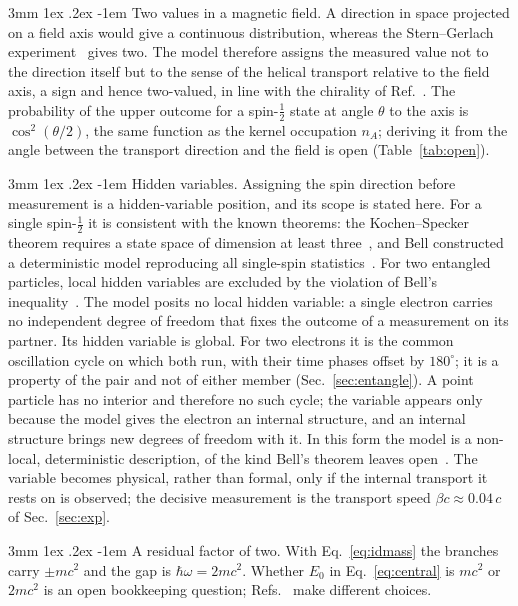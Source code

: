 \documentclass[%
 reprint, amsmath,amssymb, aps, prb, ]{revtex4-2}
\makeatletter
\numberwithin{equation}{section}
\renewcommand\paragraph{%
  \@startsection{paragraph}{4}{\z@}%
    {3mm \@plus 1ex \@minus .2ex}
    {-1em}
    {\normalfont\normalsize\itshape}}
\makeatother
\begin{document}
\paragraph{Two values in a magnetic field.} A direction in space projected on a field axis would give a continuous distribution, whereas the Stern--Gerlach experiment~\cite{ref:gerlach} gives two. The model therefore assigns the measured value not to the direction itself but to the sense of the helical transport relative to the field axis, a sign and hence two-valued, in line with the chirality of Ref.~\cite{ref:p50}. The probability of the upper outcome for a spin-$\tfrac12$ state at angle $\theta$ to the axis is $\cos^2(\theta/2)$, the same function as the kernel occupation $n_A$; deriving it from the angle between the transport direction and the field is open (Table~\ref{tab:open}).

\paragraph{Hidden variables.} Assigning the spin direction before measurement is a hidden-variable position, and its scope is stated here. For a single spin-$\tfrac12$ it is consistent with the known theorems: the Kochen--Specker theorem requires a state space of dimension at least three~\cite{ref:kochen67}, and Bell constructed a deterministic model reproducing all single-spin statistics~\cite{ref:bell66}. For two entangled particles, local hidden variables are excluded by the violation of Bell's inequality~\cite{ref:bell64,ref:chsh,ref:aspect82}. The model posits no local hidden variable: a single electron carries no independent degree of freedom that fixes the outcome of a measurement on its partner. Its hidden variable is global. For two electrons it is the common oscillation cycle on which both run, with their time phases offset by $180^\circ$; it is a property of the pair and not of either member (Sec.~\ref{sec:entangle}). A point particle has no interior and therefore no such cycle; the variable appears only because the model gives the electron an internal structure, and an internal structure brings new degrees of freedom with it. In this form the model is a non-local, deterministic description, of the kind Bell's theorem leaves open~\cite{ref:bohm52}. The variable becomes physical, rather than formal, only if the internal transport it rests on is observed; the decisive measurement is the transport speed $\beta c\approx0.04\,c$ of Sec.~\ref{sec:exp}.

\paragraph{A residual factor of two.} With Eq.~\eqref{eq:idmass} the branches carry $\pm mc^2$ and the gap is $\hbar\omega=2mc^2$. Whether $E_0$ in Eq.~\eqref{eq:central} is $mc^2$ or $2mc^2$ is an open bookkeeping question; Refs.~\cite{ref:p38,ref:p43,ref:p46} make different choices.
\end{document}
